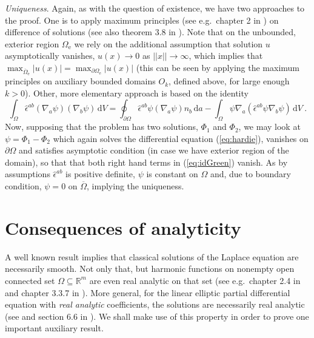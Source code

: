 \documentclass[12pt]{iopart}
\newcommand{\dd}{\partial}
\newcommand{\nab}[1]{\nabla_{\! #1}}
\newcommand{\vol}{\df V}
\newcommand{\df}{\mathrm{d}}
\newcommand{\be}{\begin{equation}}
\newcommand{\ee}{\end{equation}}
\newcommand{\0}{\vct{0}}
\newcommand{\rr}{\mathds{R}}
\newcommand{\cl}[1]{\overline{#1}}
\theoremstyle{plain} \newtheorem{tm}{Theorem}[section]
\theoremstyle{plain} \newtheorem{lm}[tm]{Lemma}
\theoremstyle{definition} \newtheorem{defn}[tm]{Definition}
\begin{document}
\emph{Uniqueness}. Again, as with the question of existence, we have two approaches to the proof. One is to apply maximum principles (see e.g.~chapter 2 in \cite{HL}) on difference of solutions (see also theorem 3.8 in \cite{GT}). Note that on the unbounded, exterior region $\Omega_\mathrm{e}$ we rely on the additional assumption that solution $u$ asymptotically vanishes, $u(x) \to 0$ as $||x|| \to \infty$, which implies that $\max_{\cl{\Omega}_\mathrm{e}} |u(x)| = \max_{\dd\Omega_\mathrm{e}} |u(x)|$ (this can be seen by applying the maximum principles on auxiliary bounded domains $O_k$, defined above, for large enough $k > 0$). Other, more elementary approach is based on the identity
\be\label{eq:idGreen}
\int_\Omega \hat{\epsilon}^{ab} (\nab{a}\psi)(\nab{b}\psi) \, \vol = \oint_{\dd\Omega} \hat{\epsilon}^{ab} \psi (\nab{a}\psi) n_b \, \df a - \int_\Omega \psi \nab{a} (\hat{\epsilon}^{ab} \psi \nab{b}\psi) \, \vol \ .
\ee
Now, supposing that the problem has two solutions, $\Phi_1$ and $\Phi_2$, we may look at $\psi = \Phi_1 - \Phi_2$ which again solves the differential equation (\ref{eq:hardie}), vanishes on $\dd\Omega$ and satisfies asymptotic condition (in case we have exterior region of the domain), so that that both right hand terms in (\ref{eq:idGreen}) vanish. As by assumptions $\hat{\epsilon}^{ab}$ is positive definite, $\psi$ is constant on $\Omega$ and, due to boundary condition, $\psi = 0$ on $\cl{\Omega}$, implying the uniqueness.

\bigskip









\renewcommand{\thesection}{Appendix \Alph{section}} %
\section{Consequences of analyticity}%
\renewcommand{\thesection}{\Alph{section}}  %

A well known result implies that classical solutions of the Laplace equation are necessarily smooth. Not only that, but harmonic functions on nonempty open connected set $\Omega \subseteq \rr^m$ are even real analytic on that set (see e.g.~chapter 2.4 in \cite{GT} and chapter 3.3.7 in \cite{Salsa}). More general, for the linear elliptic partial differential equation with \emph{real analytic} coefficients, the solutions are necessarily real analytic (see \cite{MN57,Morrey58} and section 6.6 in \cite{Morrey}). We shall make use of this property in order to prove one important auxiliary result.
\end{document}
